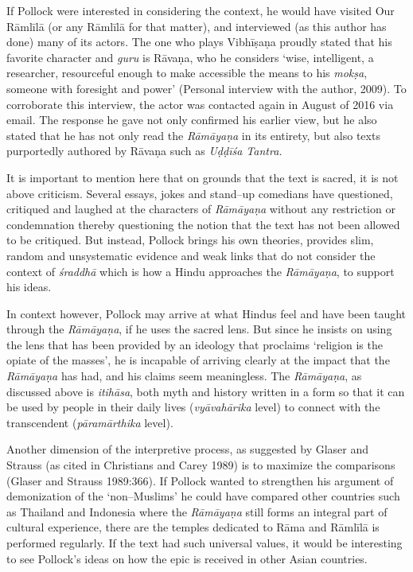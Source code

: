If Pollock were interested in considering the context, he would have visited Our Rāmlīlā (or any Rāmlīlā for that matter), and interviewed (as this author has done) many of its actors. The one who plays Vibhīṣaṇa proudly stated that his favorite character and \textit{guru} is Rāvaṇa, who he considers ‘wise, intelligent, a researcher, resourceful enough to make accessible the means to his \textit{mokṣa}, someone with foresight and power’ (Personal interview with the author, 2009). To corroborate this interview, the actor was contacted again in August of 2016 via email. The response he gave not only confirmed his earlier view, but he also stated that he has not only read the \textit{Rāmāyaṇa} in its entirety, but also texts purportedly authored by Rāvaṇa such as \textit{Uḍḍīśa Tantra.}

It is important to mention here that on grounds that the text is sacred, it is not above criticism. Several essays, jokes and stand–up comedians have questioned, critiqued and laughed at the characters of \textit{Rāmāyaṇa} without any restriction or condemnation thereby questioning the notion that the text has not been allowed to be critiqued. But instead, Pollock brings his own theories, provides slim, random and unsystematic evidence and weak links that do not consider the context of \textit{śraddhā} which is how a Hindu approaches the \textit{Rāmāyaṇa}, to support his ideas.

In context however, Pollock may arrive at what Hindus feel and have been taught through the \textit{Rāmāyaṇa}, if he uses the sacred lens. But since he insists on using the lens that has been provided by an ideology that proclaims ‘religion is the opiate of the masses’, he is incapable of arriving clearly at the impact that the \textit{Rāmāyaṇa} has had, and his claims seem meaningless. The \textit{Rāmāyaṇa}, as discussed above is \textit{itihāsa}, both myth and history written in a form so that it can be used by people in their daily lives (\textit{vyāvahārika} level) to connect with the transcendent (\textit{pāramārthika} level).

Another dimension of the interpretive process, as suggested by Glaser and Strauss (as cited in Christians and Carey 1989) is to maximize the comparisons (Glaser and Strauss 1989:366). If Pollock wanted to strengthen his argument of demonization of the ‘non–Muslims’ he could have compared other countries such as Thailand and Indonesia where the \textit{Rāmāyaṇa} still forms an integral part of cultural experience, there are the temples dedicated to Rāma and Rāmlīlā is performed regularly. If the text had such universal values, it would be interesting to see Pollock’s ideas on how the epic is received in other Asian countries.

